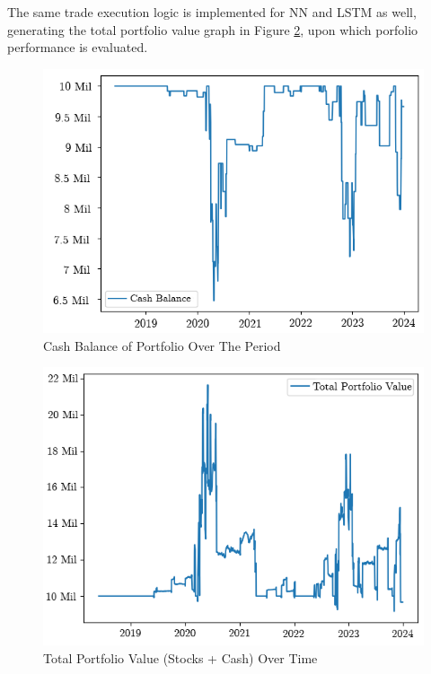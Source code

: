 \documentclass[a4paper,12pt]{report}
\numberwithin{equation}{section}
\theoremstyle{definition}
\begin{document}
The same trade execution logic is implemented for NN and LSTM as well, generating the total portfolio value graph in Figure \ref{fig:Total portfolio Value}, upon which porfolio performance is evaluated.

\begin{figure}[H]
  \centerline{\includegraphics[width=13cm]{LR Cash Balance}}
  \caption{Cash Balance of Portfolio Over The Period}
  \label{fig:Cash Balance of Portfolio}
\end{figure}

\begin{figure}[H]
  \centerline{\includegraphics[width=13cm]{Total Portfolio Value LR}}
  \caption{Total Portfolio Value (Stocks + Cash) Over Time}
  \label{fig:Total portfolio Value}
\end{figure}
\end{document}
